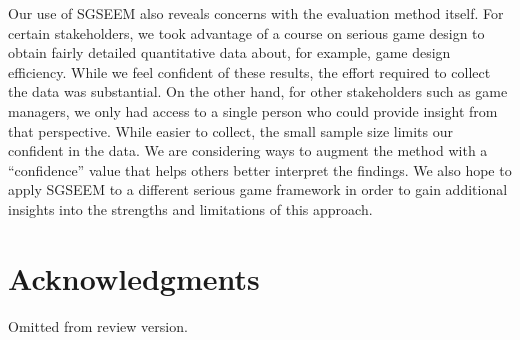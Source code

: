 \documentclass{sigchi}
\begin{document}
Our use of SGSEEM also reveals concerns with the evaluation method itself.  For certain
stakeholders, we took advantage of a course on serious game design to obtain fairly
detailed quantitative data about, for example, game design efficiency.  While we feel
confident of these results, the effort required to collect the data was substantial.  On
the other hand, for other stakeholders such as game managers, we only had access to a
single person who could provide insight from that perspective.  While easier to collect,
the small sample size limits our confident in the data.  We are considering ways to
augment the method with a ``confidence'' value that helps others better interpret the
findings.  We also hope to apply SGSEEM to a different serious game framework in order to
gain additional insights into the strengths and limitations of this approach.







\section{Acknowledgments}
Omitted from review version.

\end{document}

